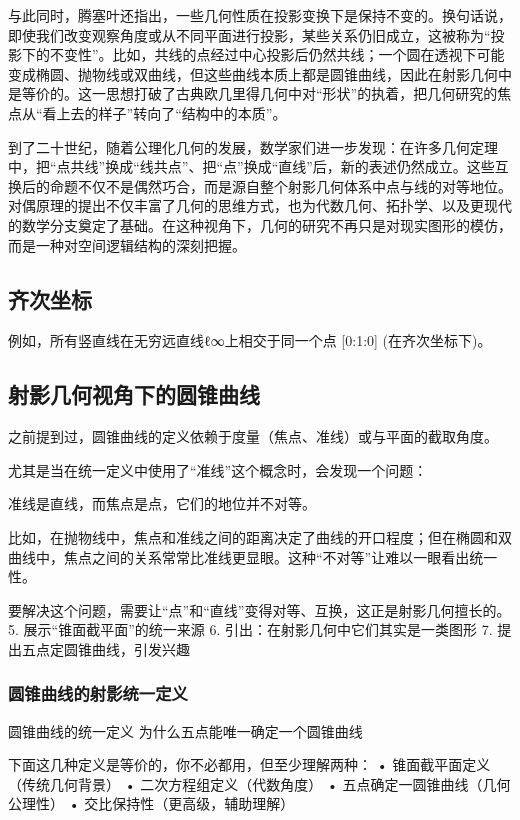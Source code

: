 与此同时，腾塞叶还指出，一些几何性质在投影变换下是保持不变的。换句话说，即使我们改变观察角度或从不同平面进行投影，某些关系仍旧成立，这被称为“投影下的不变性”。比如，共线的点经过中心投影后仍然共线；一个圆在透视下可能变成椭圆、抛物线或双曲线，但这些曲线本质上都是圆锥曲线，因此在射影几何中是等价的。这一思想打破了古典欧几里得几何中对“形状”的执着，把几何研究的焦点从“看上去的样子”转向了“结构中的本质”。

到了二十世纪，随着公理化几何的发展，数学家们进一步发现：在许多几何定理中，把“点共线”换成“线共点”、把“点”换成“直线”后，新的表述仍然成立。这些互换后的命题不仅不是偶然巧合，而是源自整个射影几何体系中点与线的对等地位。对偶原理的提出不仅丰富了几何的思维方式，也为代数几何、拓扑学、以及更现代的数学分支奠定了基础。在这种视角下，几何的研究不再只是对现实图形的模仿，而是一种对空间逻辑结构的深刻把握。


\subsection{齐次坐标}
例如，所有竖直线在无穷远直线ℓ∞上相交于同一个点 [0:1:0] (在齐次坐标下)。
\subsection{射影几何视角下的圆锥曲线}

之前提到过，圆锥曲线的定义依赖于度量（焦点、准线）或与平面的截取角度。

尤其是当在统一定义中使用了“准线”这个概念时，会发现一个问题：

准线是直线，而焦点是点，它们的地位并不对等。

比如，在抛物线中，焦点和准线之间的距离决定了曲线的开口程度；但在椭圆和双曲线中，焦点之间的关系常常比准线更显眼。这种“不对等”让难以一眼看出统一性。

要解决这个问题，需要让“点”和“直线”变得对等、互换，这正是射影几何擅长的。
	5.	展示“锥面截平面”的统一来源
	6.	引出：在射影几何中它们其实是一类图形
	7.	提出五点定圆锥曲线，引发兴趣

\subsubsection{圆锥曲线的射影统一定义}

圆锥曲线的统一定义	为什么五点能唯一确定一个圆锥曲线


下面这几种定义是等价的，你不必都用，但至少理解两种：
	•	锥面截平面定义（传统几何背景）
	•	二次方程组定义（代数角度）
	•	五点确定一圆锥曲线（几何公理性）
	•	交比保持性（更高级，辅助理解）

